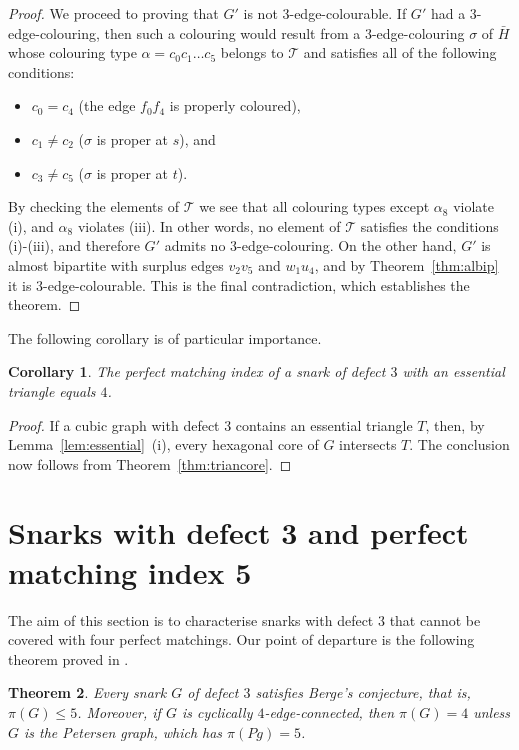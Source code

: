 \documentclass[a4paper]{amsart}
\theoremstyle{plain}
\newtheorem{theorem}{Theorem}[section]
\newtheorem{corollary}[theorem]{Corollary}
\theoremstyle{definition}
\begin{document}
\begin{proof}
We proceed to proving that $G'$ is not $3$-edge-colourable. If
$G'$ had a $3$-edge-colouring, then such a colouring would
result from a $3$-edge-colouring $\sigma$ of $\bar H$ whose
colouring type $\alpha=c_0c_1\ldots c_5$ belongs to
$\mathcal{T}$ and satisfies all of the following conditions:
\begin{itemize}
 \item[(i)] \quad $c_0 = c_4$ \quad (the edge $f_0f_4$ is
     properly coloured),
 \item[(ii)] \quad $c_1\ne c_2$ \quad ($\sigma$ is proper
     at $s$), and
 \item[(iii)] \quad $c_3\ne c_5$ \quad ($\sigma$ is proper
     at $t$).
\end{itemize}
By checking the elements of $\mathcal{T}$ we see that all
colouring types except $\alpha_8$ violate (i), and $\alpha_8$
violates (iii). In other words, no element of $\mathcal{T}$
satisfies the conditions (i)-(iii), and therefore $G'$ admits
no $3$-edge-colouring. On the other hand, $G'$ is almost
bipartite with surplus edges $v_2v_5$ and $w_1u_4$, and by
Theorem~\ref{thm:albip} it is $3$-edge-colourable. This is the
final contradiction, which establishes the theorem.
\end{proof}

The following corollary is of particular importance.

\begin{corollary}\label{cor:esstrian}
The perfect matching index of a snark of defect $3$ with
an essential triangle equals $4$.
\end{corollary}

\begin{proof}
If a cubic graph with defect $3$ contains an essential triangle
$T$, then, by Lemma~\ref{lem:essential}~(i), every hexagonal
core of $G$ intersects $T$. The conclusion now follows from
Theorem~\ref{thm:triancore}.
\end{proof}

\section{Snarks with defect 3 and perfect matching index 5}
\label{sec:pmi5}

\noindent{}The aim of this section is to characterise snarks
with defect $3$ that cannot be covered with four perfect
matchings. Our point of departure is the following theorem
proved in \cite[Theorems~1.1 and~1.2]{KMNS-Berge}.

\begin{theorem}\label{thm:pmi-c4c}
Every snark $G$ of defect $3$ satisfies Berge's conjecture,
that is, $\pi(G)\le 5$. Moreover, if $G$ is cyclically
$4$-edge-connected, then $\pi(G)=4$ unless $G$ is the Petersen
graph, which has $\pi(Pg)=5$.
\end{theorem}
\end{document}
